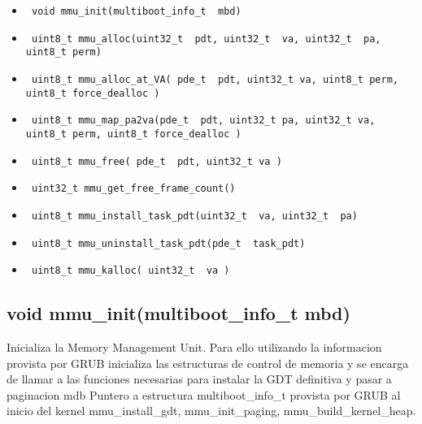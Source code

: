 \documentclass[a4paper,10pt]{article}
\begin{document}
\begin{itemize}
\item \begin{verbatim} void mmu_init(multiboot_info_t  mbd) \end{verbatim} 
\item \begin{verbatim} uint8_t mmu_alloc(uint32_t  pdt, uint32_t  va, uint32_t  pa, uint8_t perm) \end{verbatim} 
\item \begin{verbatim} uint8_t mmu_alloc_at_VA( pde_t  pdt, uint32_t va, uint8_t perm, uint8_t force_dealloc ) \end{verbatim} 
\item \begin{verbatim} uint8_t mmu_map_pa2va(pde_t  pdt, uint32_t pa, uint32_t va, uint8_t perm, uint8_t force_dealloc ) \end{verbatim}    
\item \begin{verbatim} uint8_t mmu_free( pde_t  pdt, uint32_t va ) \end{verbatim} 
\item \begin{verbatim} uint32_t mmu_get_free_frame_count() \end{verbatim} 
\item \begin{verbatim} uint8_t mmu_install_task_pdt(uint32_t  va, uint32_t  pa) \end{verbatim} 
\item \begin{verbatim} uint8_t mmu_uninstall_task_pdt(pde_t  task_pdt) \end{verbatim} 
\item \begin{verbatim} uint8_t mmu_kalloc( uint32_t  va ) \end{verbatim} 
\end{itemize}


\subsection*{ void mmu\_init(multiboot\_info\_t  mbd)}
Inicializa la Memory Management Unit. Para ello utilizando la informacion provista por GRUB inicializa las estructuras de control de memoria y se encarga de llamar a las funciones necesarias para instalar la GDT definitiva y pasar a paginacion mdb Puntero a estructura multiboot\_info\_t provista por GRUB al inicio del kernel mmu\_install\_gdt, mmu\_init\_paging, mmu\_build\_kernel\_heap.
\end{document}
